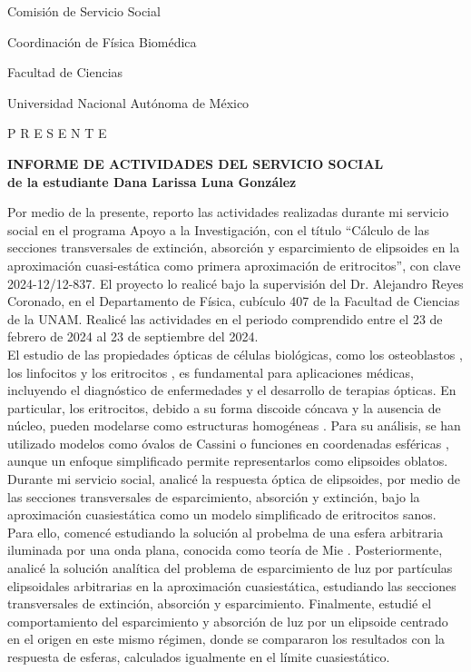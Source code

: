 \documentclass[9pt,letterpaper]{article}
\begin{document}
	Comisión de Servicio Social
	
	Coordinación de Física Biomédica
	
	Facultad de Ciencias
	
	Universidad Nacional Autónoma de México
	
	P R E S E N T E
	
	\vspace{1cm}
	
	\begin{center}
		\textbf{INFORME DE ACTIVIDADES DEL SERVICIO SOCIAL}\\
		\textbf{de la estudiante Dana Larissa Luna González}
	\end{center}
	
Por medio de la presente, reporto las actividades realizadas durante mi servicio social en el programa Apoyo a la Investigación, con el título ``Cálculo de las secciones transversales de extinción, absorción y esparcimiento de elipsoides en la aproximación cuasi-estática como primera aproximación de eritrocitos'', con clave 2024-12/12-837. El proyecto lo realicé bajo la supervisión del Dr. Alejandro Reyes Coronado, en el Departamento de Física, cubículo 407 de la Facultad de Ciencias de la UNAM. Realicé las actividades en el periodo comprendido entre el 23 de febrero de 2024 al 23 de septiembre del 2024. \\

El estudio de las propiedades ópticas de células biológicas, como los osteoblastos \cite{Osteoblastos}, los linfocitos \cite{Linfocitos} y los eritrocitos \cite{Blood}, es fundamental para aplicaciones médicas, incluyendo el diagnóstico de enfermedades y el desarrollo de terapias ópticas. En particular, los eritrocitos, debido a su forma discoide cóncava y la ausencia de núcleo, pueden modelarse como estructuras homogéneas \cite{Cassini}. Para su análisis, se han utilizado modelos como óvalos de Cassini \cite{Cassini} o funciones en coordenadas esféricas \cite{Esferico}, aunque un enfoque simplificado permite representarlos como elipsoides oblatos.\\

 Durante mi servicio social, analicé la respuesta óptica de elipsoides, por medio de las secciones transversales de esparcimiento, absorción y extinción, bajo la aproximación cuasiestática como un modelo simplificado de eritrocitos sanos. Para ello, comencé estudiando la solución al probelma de una esfera arbitraria iluminada por una onda plana, conocida como teoría de Mie \cite{Bohren}. Posteriormente, analicé la solución analítica del problema de esparcimiento de luz por partículas elipsoidales arbitrarias en la aproximación cuasiestática, estudiando las secciones transversales de extinción, absorción y esparcimiento. Finalmente, estudié el comportamiento del esparcimiento y absorción de luz por un elipsoide centrado en el origen en este mismo régimen, donde se compararon los resultados con la respuesta de esferas, calculados igualmente en el límite cuasiestático.\\
 
\end{document}
